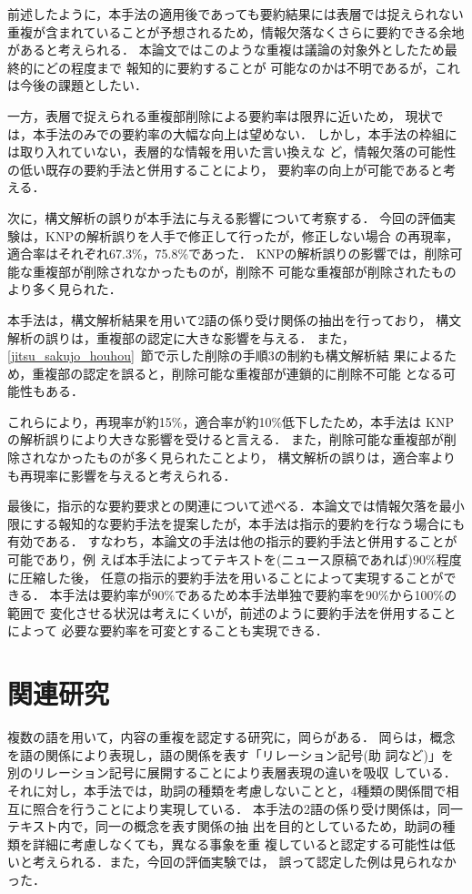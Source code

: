 前述したように，本手法の適用後であっても要約結果には表層では捉えられない
重複が含まれていることが予想されるため，情報欠落なくさらに要約できる余地
があると考えられる．
本論文ではこのような重複は議論の対象外としたため最終的にどの程度まで
報知的に要約することが
可能なのかは不明であるが，これは今後の課題としたい．

一方，表層で捉えられる重複部削除による要約率は限界に近いため，
現状では，本手法のみでの要約率の大幅な向上は望めない．
しかし，本手法の枠組には取り入れていない，表層的な情報を用いた言い換えな
ど，情報欠落の可能性の低い既存の要約手法と併用することにより，
要約率の向上が可能であると考える．

\vspace{1.5ex}

次に，構文解析の誤りが本手法に与える影響について考察する．
今回の評価実験は，KNPの解析誤りを人手で修正して行ったが，修正しない場合
の再現率，適合率はそれぞれ67.3\%，75.8\%であった．
KNPの解析誤りの影響では，削除可能な重複部が削除されなかったものが，削除不
可能な重複部が削除されたものより多く見られた．

本手法は，構文解析結果を用いて2語の係り受け関係の抽出を行っており，
構文解析の誤りは，重複部の認定に大きな影響を与える．
また，\ref{jitsu_sakujo_houhou}~節で示した削除の手順3の制約も構文解析結
果によるため，重複部の認定を誤ると，削除可能な重複部が連鎖的に削除不可能
となる可能性もある．

これらにより，再現率が約15\%，適合率が約10\%低下したため，本手法は
KNPの解析誤りにより大きな影響を受けると言える．
また，削除可能な重複部が削除されなかったものが多く見られたことより，
構文解析の誤りは，適合率よりも再現率に影響を与えると考えられる．

\vspace{1.5ex}

最後に，指示的な要約要求との関連について述べる．本論文では情報欠落を最小
限にする報知的な要約手法を提案したが，本手法は指示的要約を行なう場合にも
有効である．
すなわち，本論文の手法は他の指示的要約手法と併用することが可能であり，例
えば本手法によってテキストを(ニュース原稿であれば)90\%程度に圧縮した後，
任意の指示的要約手法を用いることによって実現することができる．
本手法は要約率が90\%であるため本手法単独で要約率を90\%から100\%の範囲で
変化させる状況は考えにくいが，前述のように要約手法を併用することによって
必要な要約率を可変とすることも実現できる．

\section{関連研究} \label{kanren}
複数の語を用いて，内容の重複を認定する研究に，岡ら\cite{oka98}がある．
岡らは，概念を語の関係により表現し，語の関係を表す「リレーション記号(助
詞など)」を別のリレーション記号に展開することにより表層表現の違いを吸収
している．
それに対し，本手法では，助詞の種類を考慮しないことと，4種類の関係間で相
互に照合を行うことにより実現している．
本手法の2語の係り受け関係は，同一テキスト内で，同一の概念を表す関係の抽
出を目的としているため，助詞の種類を詳細に考慮しなくても，異なる事象を重
複していると認定する可能性は低いと考えられる．また，今回の評価実験では，
誤って認定した例は見られなかった．

